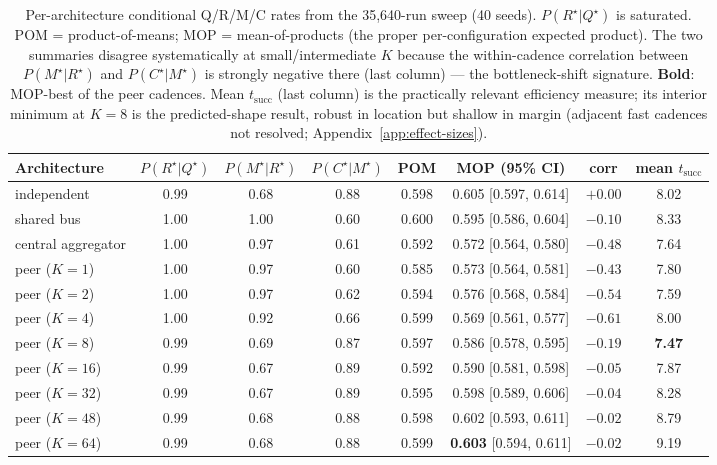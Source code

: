 \documentclass{article}
\begin{document}
\begin{table}[h]
\caption{Per-architecture conditional Q/R/M/C rates from the 35{,}640-run sweep (40 seeds). $P(R^\star|Q^\star)$ is saturated. POM = product-of-means; MOP = mean-of-products (the proper per-configuration expected product). The two summaries disagree systematically at small/intermediate $K$ because the within-cadence correlation between $P(M^\star|R^\star)$ and $P(C^\star|M^\star)$ is strongly negative there (last column) --- the bottleneck-shift signature. \textbf{Bold}: MOP-best of the peer cadences. Mean $t_{\mathrm{succ}}$ (last column) is the practically relevant efficiency measure; its interior minimum at $K=8$ is the predicted-shape result, robust in location but shallow in margin (adjacent fast cadences not resolved; Appendix~\ref{app:effect-sizes}).}
\label{tab:multi-agent-cond}
\centering
\scriptsize
\setlength{\tabcolsep}{3.5pt}
\begin{tabular}{l c c c c c c c}
\toprule
Architecture & $P(R^\star|Q^\star)$ & $P(M^\star|R^\star)$ & $P(C^\star|M^\star)$ & POM & MOP (95\% CI) & corr & mean $t_{\mathrm{succ}}$ \\
\midrule
independent          & 0.99 & 0.68 & 0.88 & 0.598 & 0.605 [0.597, 0.614] & $+0.00$ & 8.02 \\
shared bus           & 1.00 & 1.00 & 0.60 & 0.600 & 0.595 [0.586, 0.604] & $-0.10$ & 8.33 \\
central aggregator   & 1.00 & 0.97 & 0.61 & 0.592 & 0.572 [0.564, 0.580] & $-0.48$ & 7.64 \\
peer ($K=1$)         & 1.00 & 0.97 & 0.60 & 0.585 & 0.573 [0.564, 0.581] & $-0.43$ & 7.80 \\
peer ($K=2$)         & 1.00 & 0.97 & 0.62 & 0.594 & 0.576 [0.568, 0.584] & $-0.54$ & 7.59 \\
peer ($K=4$)         & 1.00 & 0.92 & 0.66 & 0.599 & 0.569 [0.561, 0.577] & $-0.61$ & 8.00 \\
peer ($K=8$)         & 0.99 & 0.69 & 0.87 & 0.597 & 0.586 [0.578, 0.595] & $-0.19$ & \textbf{7.47} \\
peer ($K=16$)        & 0.99 & 0.67 & 0.89 & 0.592 & 0.590 [0.581, 0.598] & $-0.05$ & 7.87 \\
peer ($K=32$)        & 0.99 & 0.67 & 0.89 & 0.595 & 0.598 [0.589, 0.606] & $-0.04$ & 8.28 \\
peer ($K=48$)        & 0.99 & 0.68 & 0.88 & 0.598 & 0.602 [0.593, 0.611] & $-0.02$ & 8.79 \\
peer ($K=64$)        & 0.99 & 0.68 & 0.88 & 0.599 & \textbf{0.603} [0.594, 0.611] & $-0.02$ & 9.19 \\
\bottomrule
\end{tabular}
\end{table}
\end{document}
